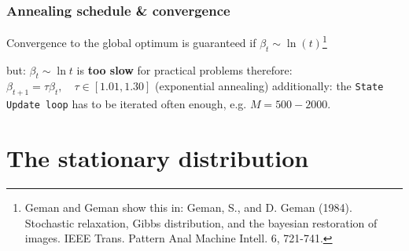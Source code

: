 \begin{itemize}
\end{itemize}


\begin{frame}\frametitle{Annealing schedule \& convergence}
Convergence to the global optimum is guaranteed if $\beta_t \sim \ln (t)$\footnote{Geman and Geman show this in: Geman, S., and D. Geman (1984). Stochastic relaxation, Gibbs distribution, and the bayesian restoration of images. IEEE Trans. Pattern Anal Machine Intell. 6, 721-741. }

\begin{itemize}
	\itR but: $\beta_t \sim \ln t$ is \textbf{too slow} for practical problems
	\itR therefore: $\beta_{t+1} = \tau \beta_t, \quad \tau \in [1.01,1.30]$
		(exponential annealing)
	\itR additionally: the \texttt{State Update loop} has to be iterated often enough, e.g. $M=500-2000$. 
\end{itemize}
\end{frame}

\section{The stationary distribution}

